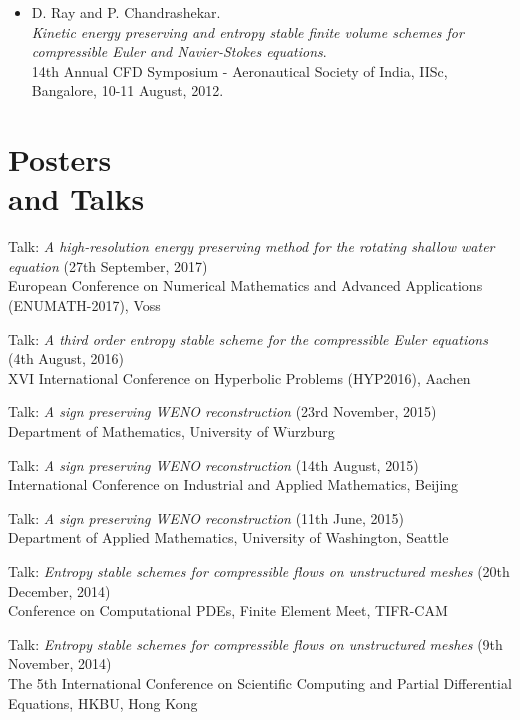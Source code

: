 \documentclass[margin]{res}
\begin{document}
\begin{resume}
\begin{itemize}
              \item D. Ray and P. Chandrashekar.\\
              {\it Kinetic energy preserving and entropy stable finite volume schemes for compressible Euler and Navier-Stokes equations}.\\
              14th Annual CFD Symposium - Aeronautical Society of India, IISc, Bangalore, 10-11 August, 2012.
             \end{itemize}
             
\section{Posters \\ and Talks}
              
              Talk: {\it A high-resolution energy preserving method for the rotating shallow water equation} (27th September, 2017)\\
               European Conference on Numerical Mathematics and Advanced Applications (ENUMATH-2017), Voss
              
              Talk: {\it A third order entropy stable scheme for the compressible Euler equations} (4th August, 2016)\\
               XVI International Conference on Hyperbolic Problems (HYP2016), Aachen 
              
              Talk: {\it A sign preserving WENO reconstruction} (23rd November, 2015)\\
               Department of Mathematics, University of W$\ddot{\text{u}}$rzburg 
              
              Talk: {\it A sign preserving WENO reconstruction} (14th August, 2015)\\
              International Conference on Industrial and Applied Mathematics, Beijing
              
              Talk: {\it A sign preserving WENO reconstruction} (11th June, 2015)\\
              Department of Applied Mathematics, University of Washington, Seattle
              
              Talk: {\it Entropy stable schemes for compressible flows on unstructured meshes} (20th December, 2014)\\
               Conference on Computational PDEs, Finite Element Meet, TIFR-CAM  
              
              Talk: {\it Entropy stable schemes for compressible flows on unstructured meshes} (9th November, 2014)\\
               The 5th International Conference on Scientific Computing and Partial Differential Equations, HKBU, Hong Kong              
             

\end{resume}
\end{document}
